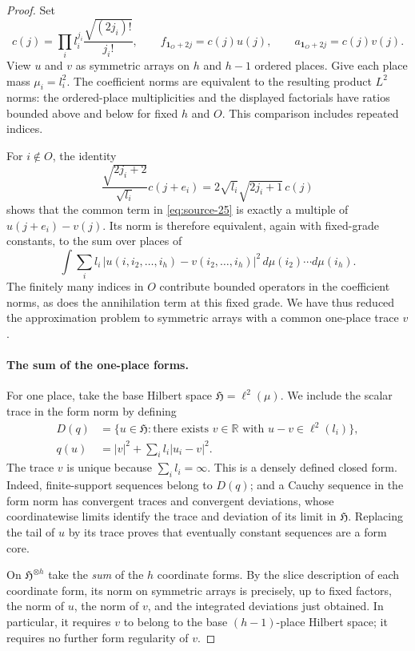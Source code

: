 \begin{proof}
Set
\[
 c(j)=\prod_i l_i^{j_i}\frac{\sqrt{(2j_i)!}}{j_i!},
 \qquad
 f_{\mathbf1_O+2j}=c(j)u(j),
 \qquad
 a_{\mathbf1_O+2j}=c(j)v(j).
\]
View $u$ and $v$ as symmetric arrays on $h$ and $h-1$ ordered places.
Give each place mass $\mu_i=l_i^2$. The coefficient norms are equivalent
to the resulting product $L^2$ norms: the ordered-place multiplicities
and the displayed factorials have ratios bounded above and below for
fixed $h$ and $O$. This comparison includes repeated indices.

For $i\notin O$, the identity
\[
 \frac{\sqrt{2j_i+2}}{\sqrt{l_i}}c(j+e_i)
 =2\sqrt{l_i}\sqrt{2j_i+1}\,c(j)
\]
shows that the common term in \eqref{eq:source-25} is exactly a multiple
of $u(j+e_i)-v(j)$. Its norm is therefore equivalent, again with
fixed-grade constants, to the sum over places of
\[
 \int \sum_i l_i\,
       |u(i,i_2,\ldots,i_h)-v(i_2,\ldots,i_h)|^2
       \,d\mu(i_2)\cdots d\mu(i_h).
\]
The finitely many indices in $O$ contribute bounded operators in the
coefficient norms, as does the annihilation term at this fixed grade.
We have thus reduced the approximation problem to symmetric arrays
with a common one-place trace $v$.

\paragraph{The sum of the one-place forms.}
For one place, take the base Hilbert space $\mathfrak H=\ell^2(\mu)$.
We include the scalar trace in the form norm by defining
\[
 \begin{split}
 D(q)&=\{u\in\mathfrak H:\text{there exists }v\in\mathbb R
                       \text{ with }u-v\in\ell^2(l_i)\},\\
 q(u)&=|v|^2+\sum_i l_i|u_i-v|^2.
 \end{split}
\]
The trace $v$ is unique because $\sum_i l_i=\infty$. This is a densely
defined closed form. Indeed, finite-support sequences belong to $D(q)$;
and a Cauchy sequence in the form norm has convergent traces and
convergent deviations, whose coordinatewise limits identify the trace
and deviation of its limit in $\mathfrak H$. Replacing the tail of $u$
by its trace proves that eventually constant sequences are a form core.

On $\mathfrak H^{\otimes h}$ take the \emph{sum} of the $h$ coordinate
forms. By the slice description of each coordinate form, its norm on
symmetric arrays is precisely, up to fixed factors, the norm of $u$,
the norm of $v$, and the integrated deviations just obtained. In
particular, it requires $v$ to belong to the base $(h-1)$-place Hilbert
space; it requires no further form regularity of $v$.


\end{proof}
